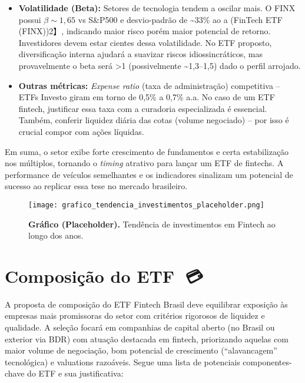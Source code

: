 \documentclass[12pt]{article}
\begin{document}
\begin{itemize}
\item \textbf{Volatilidade (Beta):} Setores de tecnologia tendem a oscilar mais. O FINX possui $\beta \sim1,65$ vs S\&P500 e desvio-padrão de \textasciitilde33\% ao a (FinTech ETF (FINX))2】, indicando maior risco porém maior potencial de retorno. Investidores devem estar cientes dessa volatilidade. No ETF proposto, diversificação interna ajudará a suavizar riscos idiossincráticos, mas provavelmente o beta será >1 (possivelmente \textasciitilde1,3–1,5) dado o perfil arrojado.

\item \textbf{Outras métricas:} \textit{Expense ratio} (taxa de administração) competitiva – ETFs Investo giram em torno de 0,5\% a 0,7\% a.a. No caso de um ETF fintech, justificar essa taxa com a curadoria especializada é essencial. Também, conferir liquidez diária das cotas (volume negociado) – por isso é crucial compor com ações líquidas.
\end{itemize}

Em suma, o setor exibe forte crescimento de fundamentos e certa estabilização nos múltiplos, tornando o \textit{timing} atrativo para lançar um ETF de fintechs. A performance de veículos semelhantes e os indicadores sinalizam um potencial de sucesso ao replicar essa tese no mercado brasileiro.

\begin{figure}[!h]
\centering
\texttt{[image: grafico\_tendencia\_investimentos\_placeholder.png]}
\caption{\textbf{Gráfico (Placeholder).} Tendência de investimentos em Fintech ao longo dos anos.}
\label{fig:trendInvest}
\end{figure}

\section*{Composição do ETF 🏦💳📱}

A proposta de composição do ETF Fintech Brasil deve equilibrar exposição às empresas mais promissoras do setor com critérios rigorosos de liquidez e qualidade. A seleção focará em companhias de capital aberto (no Brasil ou exterior via BDR) com atuação destacada em fintech, priorizando aquelas com maior volume de negociação, bom potencial de crescimento (“alavancagem” tecnológica) e valuations razoáveis. Segue uma lista de potenciais componentes-chave do ETF e sua justificativa:
\end{document}
